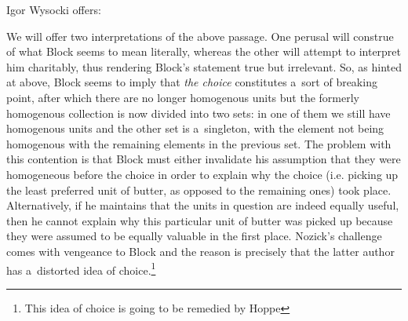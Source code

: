 \begin{artengenv}{Igor Wysocki}
\parencite*[][p.424]{block_robert_1980} %
 offers:

We will offer two interpretations of the above passage. One perusal will construe of what Block seems to mean literally, whereas the other will attempt to interpret him charitably, thus rendering Block's statement true but irrelevant. So, as hinted at above, Block seems to imply that \textit{the choice} constitutes a~sort of breaking point, after which there are no longer homogenous units but the formerly homogenous collection is now divided into two sets: in one of them we still have homogenous units and the other set is a~singleton, with the element not being homogenous with the remaining elements in the previous set. The problem with this contention is that Block must either invalidate his assumption that they were homogeneous before the choice in order to explain why the choice (i.e. picking up the least preferred unit of butter, as opposed to the remaining ones) took place. Alternatively, if he maintains that the units in question are indeed equally useful, then he cannot explain why this particular unit of butter was picked up because they were assumed to be equally valuable in the first place. Nozick's challenge comes with vengeance to Block and the reason is precisely that the latter author has a~distorted idea of choice.\footnote{This idea of choice is going to be remedied by Hoppe
}
\end{artengenv}
